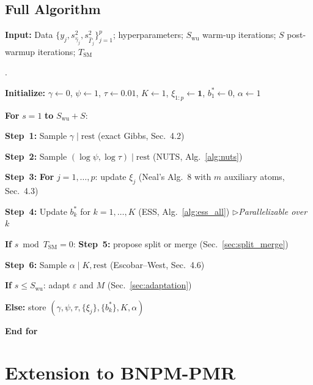 \documentclass[12pt, a4paper]{article}
\theoremstyle{remark}
\newcommand{\pco}[1]{\item #1}                          %
\newcommand{\pci}[1]{\item\hspace{1.5em}#1}             %
\newcommand{\kw}[1]{\textbf{#1}}                        %
\newcommand{\cm}[1]{\hfill$\triangleright$\;\textit{\small #1}} %
\newcounter{pcline}
\newenvironment{pseudocode}{%
  \setcounter{pcline}{0}%
  \begin{list}{\scriptsize\arabic{pcline}.}{%
    \usecounter{pcline}%
    \setlength{\leftmargin}{2.5em}%
    \setlength{\itemsep}{1pt}%
    \setlength{\parsep}{0pt}%
    \setlength{\topsep}{3pt}%
    \small
  }%
}{%
  \end{list}%
}
\begin{document}
\subsection{Full Algorithm}

\begin{algfloat}[H]
\caption{Full Proposed MCMC Sampler for BNPM-PMR
  ($\tau = 0$ for BNPM-MR)}
\label{alg:full}
\begin{mdframed}[linewidth=0.6pt, innertopmargin=6pt, innerbottommargin=6pt]
\textbf{Input:} Data $\{y_j, s^2_{\hat\gamma_j}, s^2_{\hat\Gamma_j}\}_{j=1}^p$;
hyperparameters; $S_{\mathrm{wu}}$ warm-up iterations;
$S$ post-warmup iterations; $T_{\mathrm{SM}}$
\begin{pseudocode}
\pco{\textbf{Initialize:} $\gamma\leftarrow 0$, $\psi\leftarrow 1$,
     $\tau\leftarrow 0.01$, $K\leftarrow 1$,
     $\xi_{1:p}\leftarrow\mathbf{1}$, $b_1^*\leftarrow 0$, $\alpha\leftarrow 1$}
\pco{\kw{For} $s = 1$ \kw{to} $S_{\mathrm{wu}} + S$:}
\pci{\textbf{Step~1:} Sample $\gamma \mid \mathrm{rest}$ (exact Gibbs, Sec.~4.2)}
\pci{\textbf{Step~2:} Sample $(\log\psi,\log\tau) \mid \mathrm{rest}$
     (NUTS, Alg.~\ref{alg:nuts})}
\pci{\textbf{Step~3:} \kw{For} $j = 1,\ldots,p$: update $\xi_j$
     (Neal's Alg.~8 with $m$ auxiliary atoms, Sec.~4.3)}
\pci{\textbf{Step~4:} Update $b_k^*$ for $k = 1,\ldots,K$
     (ESS, Alg.~\ref{alg:ess_all}) \cm{Parallelizable over $k$}}
\pci{\kw{If} $s \bmod T_{\mathrm{SM}} = 0$:
     \textbf{Step~5:} propose split or merge (Sec.~\ref{sec:split_merge})}
\pci{\textbf{Step~6:} Sample $\alpha \mid K, \mathrm{rest}$
     (Escobar--West, Sec.~4.6)}
\pci{\kw{If} $s \leq S_{\mathrm{wu}}$: adapt $\varepsilon$ and $M$ (Sec.~\ref{sec:adaptation})}
\pci{\kw{Else:} store $(\gamma,\psi,\tau,\{\xi_j\},\{b_k^*\},K,\alpha)$}
\pco{\kw{End for}}
\end{pseudocode}
\end{mdframed}
\end{algfloat}

\section{Extension to BNPM-PMR}
\end{document}
